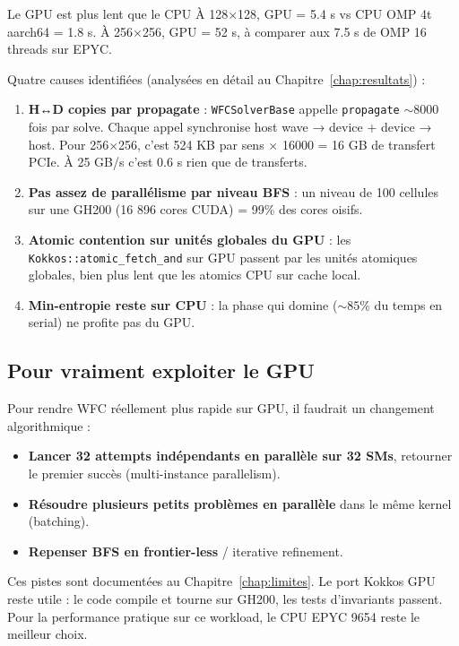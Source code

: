 \begin{important}{Le GPU est plus lent que le CPU}
À 128×128, GPU = 5.4 s vs CPU OMP 4t aarch64 = 1.8 s. À 256×256, GPU = 52 s, à comparer aux 7.5 s de OMP 16 threads sur EPYC.
\end{important}

Quatre causes identifiées (analysées en détail au Chapitre~\ref{chap:resultats}) :

\begin{enumerate}
    \item \textbf{H↔D copies par propagate} : \texttt{WFCSolverBase} appelle \texttt{propagate} $\sim 8000$ fois par solve. Chaque appel synchronise host wave → device + device → host. Pour 256×256, c'est 524 KB par sens × 16000 = 16 GB de transfert PCIe. À 25 GB/s c'est 0.6 s rien que de transferts.
    \item \textbf{Pas assez de parallélisme par niveau BFS} : un niveau de 100 cellules sur une GH200 (16 896 cores CUDA) = 99\% des cores oisifs.
    \item \textbf{Atomic contention sur unités globales du GPU} : les \texttt{Kokkos::atomic\_fetch\_and} sur GPU passent par les unités atomiques globales, bien plus lent que les atomics CPU sur cache local.
    \item \textbf{Min-entropie reste sur CPU} : la phase qui domine ($\sim 85\%$ du temps en serial) ne profite pas du GPU.
\end{enumerate}

\subsection{Pour vraiment exploiter le GPU}

Pour rendre WFC réellement plus rapide sur GPU, il faudrait un changement algorithmique :

\begin{itemize}
    \item \textbf{Lancer 32 attempts indépendants en parallèle sur 32 SMs}, retourner le premier succès (multi-instance parallelism).
    \item \textbf{Résoudre plusieurs petits problèmes en parallèle} dans le même kernel (batching).
    \item \textbf{Repenser BFS en frontier-less} / iterative refinement.
\end{itemize}

Ces pistes sont documentées au Chapitre~\ref{chap:limites}. Le port Kokkos GPU reste utile : le code compile et tourne sur GH200, les tests d'invariants passent. Pour la performance pratique sur ce workload, le CPU EPYC 9654 reste le meilleur choix.

